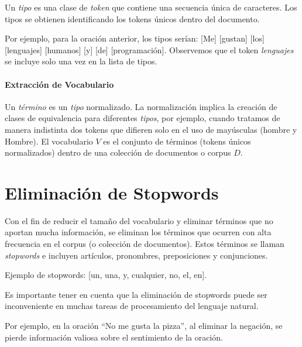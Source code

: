 Un \emph{tipo} es una clase de \emph{token} que contiene una secuencia única de caracteres. Los tipos se obtienen identificando los tokens únicos dentro del documento.

\begin{example}
Por ejemplo, para la oración anterior, los tipos serían: [Me] [gustan] [los] [lenguajes] [humanos] [y] [de] [programación]. Observemos que el token \emph{lenguajes} se incluye solo una vez en la lista de tipos. 
\end{example}



\paragraph{Extracción de Vocabulario}

Un \emph{término} es un \emph{tipo} normalizado. La normalización implica la creación de clases de equivalencia para diferentes \emph{tipos}, por ejemplo, cuando tratamos de manera indistinta dos tokens que difieren solo en el uso de mayúsculas (hombre y Hombre). El vocabulario $V$ es el conjunto de términos (tokens únicos normalizados) dentro de una colección de documentos o corpus $D$.

\section{Eliminación de Stopwords}

Con el fin de reducir el tamaño del vocabulario y eliminar términos que no aportan mucha información, se eliminan los términos que ocurren con alta frecuencia en el corpus (o colección de documentos). Estos términos se llaman \emph{stopwords} e incluyen artículos, pronombres, preposiciones y conjunciones.

\begin{example}
Ejemplo de stopwords: [un, una, y, cualquier, no, el, en]. 
\end{example}


Es importante tener en cuenta que la eliminación de stopwords puede ser inconveniente en muchas tareas de procesamiento del lenguaje natural. 

\begin{example}
Por ejemplo, en la oración ``No me gusta la pizza'', al eliminar la negación, se pierde información valiosa sobre el sentimiento de la oración. 
\end{example}



